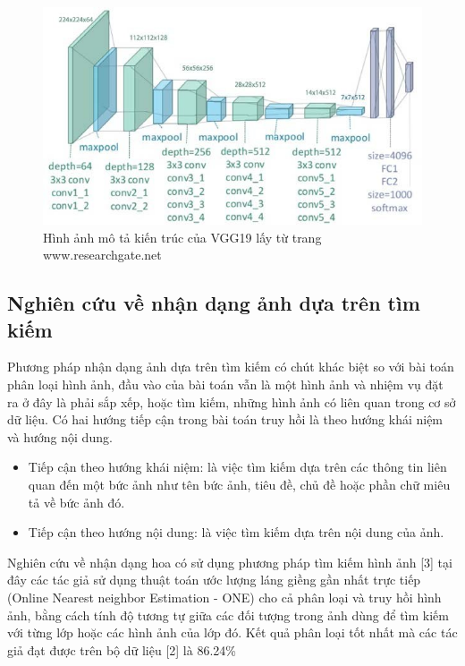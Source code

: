 \documentclass[12pt]{report}
\begin{document}
		\begin{figure}[h]
			\centering
			\includegraphics[scale=0.7]{vgg19_image}
			\caption{Hình ảnh mô tả kiến trúc của VGG19 lấy từ trang www.researchgate.net}
			\label{fig:vgg19_image}
		\end{figure}
																						
		\subsection{Nghiên cứu về nhận dạng ảnh dựa trên tìm kiếm}
																						
		Phương pháp nhận dạng ảnh dựa trên tìm kiếm có chút khác biệt so với bài toán phân loại hình ảnh, đầu vào của bài toán vẫn là một hình ảnh và nhiệm vụ đặt ra ở đây là phải sắp xếp, hoặc tìm kiếm, những hình ảnh có liên quan trong cơ sở dữ liệu. Có hai hướng tiếp cận trong bài toán truy hồi là theo hướng khái niệm và hướng nội dung.
																				
		\begin{itemize}
			\item Tiếp cận theo hướng khái niệm: là việc tìm kiếm dựa trên các thông tin liên quan đến một bức ảnh như tên bức ảnh, tiêu đề, chủ đề hoặc phần chữ miêu tả về bức ảnh đó.
			\item Tiếp cận theo hướng nội dung: là việc tìm kiếm dựa trên nội dung của ảnh.
		\end{itemize}
		Nghiên cứu về nhận dạng hoa có sử dụng phương pháp tìm kiếm hình ảnh [3] tại đây các tác giả sử dụng thuật toán ước lượng láng giềng gần nhất trực tiếp (Online Nearest neighbor Estimation - ONE) cho cả phân loại và truy hồi hình ảnh, bằng cách tính độ tương tự giữa các đối tượng trong ảnh dùng để tìm kiếm với từng lớp hoặc các hình ảnh của lớp đó. Kết quả phân loại tốt nhất mà các tác giả đạt được trên bộ dữ liệu [2] là 86.24\%
																				
\end{document}
